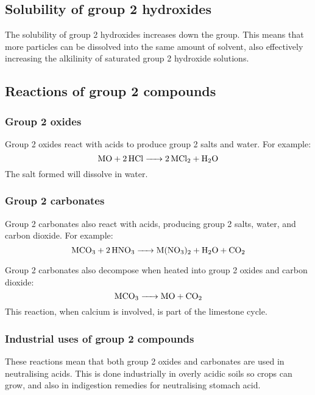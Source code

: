 \subsection{Solubility of group 2 hydroxides}
The solubility of group 2 hydroxides increases down the group. This means that more particles can be dissolved into the same amount of solvent, also effectively increasing the alkilinity of saturated group 2 hydroxide solutions.

\subsection{Reactions of group 2 compounds}
\subsubsection{Group 2 oxides}
Group 2 oxides react with acids to produce group 2 salts and water. For example:
\begin{equation}
	\ce{MO + 2HCl -> 2MCl2 + H2O}
\end{equation}
The salt formed will dissolve in water.

\subsubsection{Group 2 carbonates}
Group 2 carbonates also react with acids, producing group 2 salts, water, and carbon dioxide. For example:
\begin{equation}
	\ce{MCO3 + 2HNO3 -> M(NO3)2 + H2O + CO2}
\end{equation}

Group 2 carbonates also decompose when heated into group 2 oxides and carbon dioxide:
\begin{equation}
	\ce{MCO3 -> MO + CO2}
\end{equation}
This reaction, when calcium is involved, is part of the limestone cycle.

\subsubsection{Industrial uses of group 2 compounds}
These reactions mean that both group 2 oxides and carbonates are used in neutralising acids. This is done industrially in overly acidic soils so crops can grow, and also in indigestion remedies for neutralising stomach acid.
